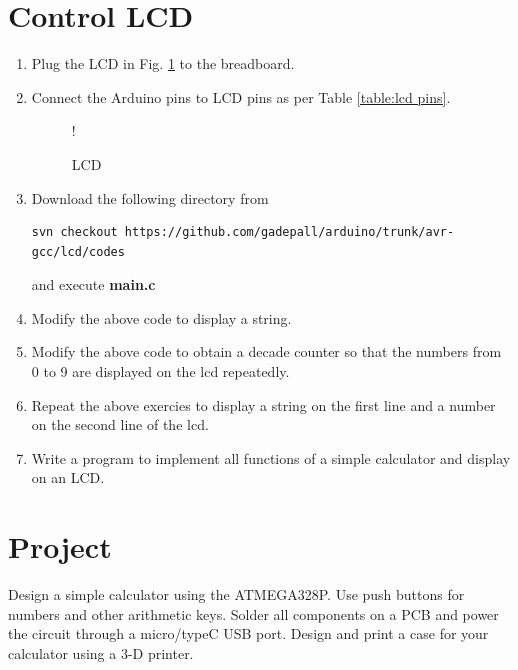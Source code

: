 \documentclass[journal,12pt,twocolumn]{IEEEtran}
\begin{document}
\section{Control LCD}
%
\begin{enumerate}[1.]
\item Plug the LCD in Fig. \ref{fig:lcd} to the breadboard.
\item Connect the Arduino pins to LCD pins as per Table \ref{table:lcd pins}.
%
\begin{figure}[!h]
\begin{center}
\resizebox {\columnwidth} {!} {

}
\end{center}
\caption{LCD}
\label{fig:lcd}
\end{figure}
%

\item Download the  following directory from
%
\begin{lstlisting}
svn checkout https://github.com/gadepall/arduino/trunk/avr-gcc/lcd/codes
\end{lstlisting}
and execute \textbf{main.c}
\item Modify the above code to display a string.
\item Modify the above code to obtain a decade counter so that the numbers from 0 to 9 are displayed on the lcd repeatedly.
\item Repeat the above exercies to display a string on the first line and a number on the second line of the lcd.
\item Write a program to implement all functions of a simple calculator and display on an LCD.
\end{enumerate}
\section{Project}
Design a simple calculator using the ATMEGA328P.  Use push buttons for numbers and other arithmetic keys.  Solder all components on a PCB and power the circuit through a micro/typeC USB port.  Design and print a case for your calculator using a 3-D printer.  
\end{document}
